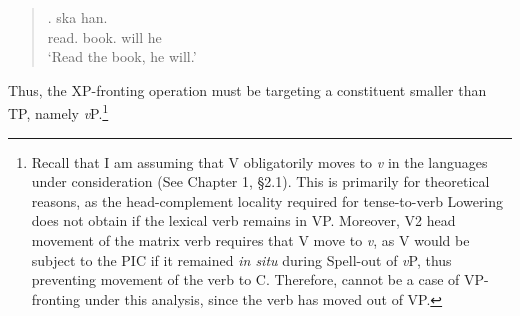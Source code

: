 \singlespacing
\begin{quote}
\exg. \I[vP L\"{a}sa boken] ska han.\\
\hspace{1pt} read. book. will he\\
`Read the book, he will.'

\end{quote}
\onehalfspacing
Thus, the XP-fronting operation must be targeting a constituent smaller than TP, namely \textit{v}P.\footnote{Recall that I am assuming that V obligatorily moves to {\it v} in the languages under consideration (See Chapter 1, \S2.1). This is primarily for theoretical reasons, as the head-complement locality required for tense-to-verb Lowering does not obtain if the lexical verb remains in VP. Moreover, V2 head movement of the matrix verb requires that V move to {\it v}, as V would be subject to the PIC if it remained {\it in situ} during Spell-out of {\it v}P, thus preventing movement of the verb to C. Therefore, \Last cannot be a case of VP-fronting under this analysis, since the verb has moved out of VP.

}
